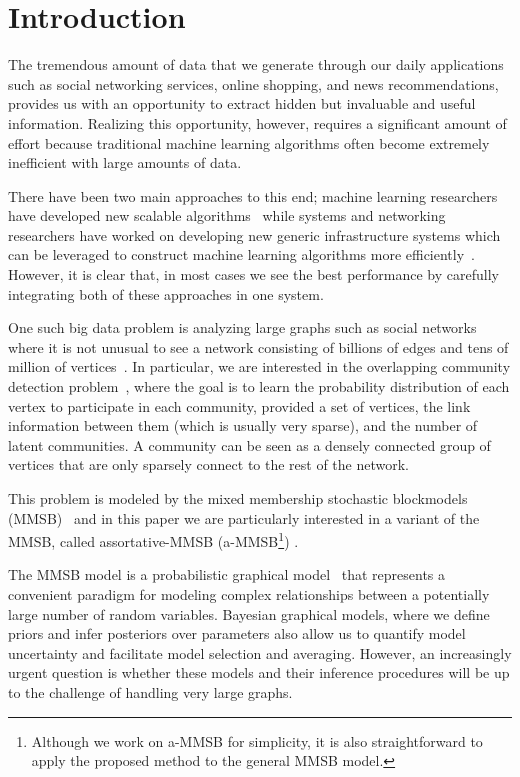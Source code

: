 \section{Introduction}
The tremendous amount of data that we generate through our daily applications such as social networking services, online shopping, and news recommendations, provides us with an opportunity to extract hidden but invaluable and useful information. Realizing this opportunity, however, requires a significant amount of effort because traditional machine learning algorithms often become extremely inefficient with large amounts of data.

There have been two main approaches to this end; machine learning researchers have developed new scalable algorithms~\cite{bottou2010large, boyd2011distributed} while systems and networking researchers have worked on developing new generic infrastructure systems which can be leveraged to construct machine learning algorithms more efficiently~\cite{dean2008mapreduce, chang2008bigtable}. However, it is clear that, in most cases we see the best performance by carefully integrating both of these approaches in one system.

One such big data problem is analyzing large graphs such as social networks where it is not unusual to see a network consisting of billions of edges and tens of million of vertices~\cite{yang2015defining}. In particular, we are interested in the overlapping community detection problem~\cite{xie2013overlapping}, where the goal is to learn the probability distribution of each vertex to participate in each community, provided a set of vertices, the link information between them (which is usually very sparse), and the number of latent communities. A community can be seen as a densely connected group of vertices that are only sparsely connect to the rest of the network. 

This problem is modeled by the mixed membership stochastic blockmodels (MMSB)~\cite{airoldi2009mixed} and in this paper we are particularly interested in a variant of the MMSB, called assortative-MMSB (a-MMSB\footnote{Although we work on a-MMSB for simplicity, it is also straightforward to apply the proposed method to the general MMSB model.}) \cite{gopalan2012scalable}.

The MMSB model is a probabilistic graphical model~\cite{koller2009probabilistic} that represents a convenient paradigm for modeling complex relationships between a potentially large number of random variables. Bayesian graphical models, where we define priors and infer posteriors over parameters also allow us to quantify model uncertainty and facilitate model selection and averaging. However, an increasingly urgent question is whether these models and their inference procedures will be up to the challenge of handling very large graphs.

